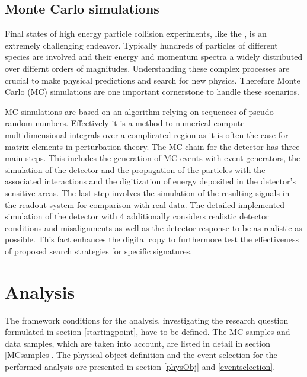 \section{Monte Carlo simulations}\label{MCsim}
Final states of high energy particle collision experiments, like the {\LHC}, is an extremely challenging endeavor. Typically hundreds of particles of different species are involved and their energy and momentum spectra a widely distributed over differnt orders of magnitudes. Understanding these complex processes are crucial to make physical predictions and search for new physics. Therefore Monte Carlo (MC) simulations are one important cornerstone to handle these scenarios. \cite{bigMC}\par
MC simulations are based on an algorithm relying on sequences of pseudo random numbers. Effectively it is a method to numerical compute multidimensional integrals over a complicated region as it is often the case for matrix elements in perturbation theory. \cite{MCbook} The MC chain for the {\ATLAS} detector has three main steps. This includes the generation of MC events with event generators, the simulation of the detector and the propagation of the particles with the associated interactions and the digitization of energy deposited in the detector's sensitive areas. The last step involves the simulation of the resulting signals in the readout system for comparison with real data. The detailed implemented simulation of the detector with {\GEANT}4\cite{GEANT4} additionally considers realistic detector conditions and misalignments as well as the detector response to be as realistic as possible. This fact enhances the digital copy to furthermore test the effectiveness of proposed search strategies for specific signatures. \cite{ATLASSim}
\chapter{Analysis}
The framework conditions for the analysis, investigating the research question formulated in section \ref{startingpoint}, have to be defined. 
The MC samples and data samples, which are taken into account, are listed in detail in section \ref{MCsamples}. The physical object definition and the event selection for the performed analysis are presented in section \ref{physObj} and \ref{eventselection}.  
